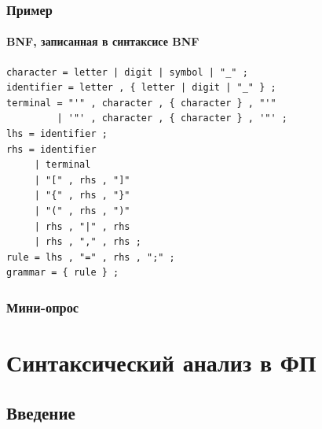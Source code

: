 \documentclass[xetex,mathserif,serif]{beamer}
\begin{document}
    \begin{frame}[fragile]
        \frametitle{Пример}
        \framesubtitle{BNF, записанная в синтаксисе BNF}
        \begin{footnotesize}
            \begin{verbatim}
character = letter | digit | symbol | "_" ;
identifier = letter , { letter | digit | "_" } ;
terminal = "'" , character , { character } , "'" 
         | '"' , character , { character } , '"' ;
lhs = identifier ;
rhs = identifier
     | terminal
     | "[" , rhs , "]"
     | "{" , rhs , "}"
     | "(" , rhs , ")"
     | rhs , "|" , rhs
     | rhs , "," , rhs ;
rule = lhs , "=" , rhs , ";" ;
grammar = { rule } ;
            \end{verbatim}
        \end{footnotesize}
    \end{frame}

    \begin{frame}
        \frametitle{Мини-опрос}
    \end{frame}

    \section{Синтаксический анализ в ФП}

    \subsection{Введение}
\end{document}
